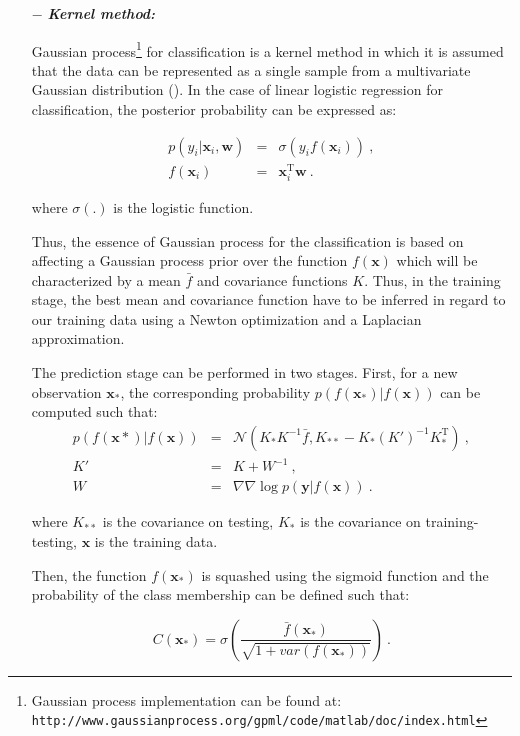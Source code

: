 \begin{enumerate}[leftmargin=*]
\item[$-$] \textbf{\textit{Kernel method:}}

Gaussian process\footnote{Gaussian process implementation can be found at: \texttt{http://www.\allowbreak gaussianprocess.org/gpml/code/matlab/doc/index.html}} for classification is a kernel method in which it is assumed that the data can be represented as a single sample from a multivariate Gaussian distribution (\cite{Rasmussen2005}). In the case of linear logistic regression for classification, the posterior probability can be expressed as:

\begin{eqnarray}
	p(y_i|\mathbf{x}_i,\mathbf{w}) & = & \sigma(y_i f(\mathbf{x}_i)) \ , \label{eq:gp1} \\
	f(\mathbf{x}_i) & = & \mathbf{x}_i^{\text{T}} \mathbf{w} \ . \nonumber
\end{eqnarray}

\noindent where $\sigma(.)$ is the logistic function.

Thus, the essence of Gaussian process for the classification is based on affecting a Gaussian process prior over the function $f(\mathbf{x})$ which will be characterized by a mean $\bar{f}$ and covariance functions $K$. Thus, in the training stage, the best mean and covariance function have to be inferred in regard to our training data using a Newton optimization and a Laplacian approximation.

The prediction stage can be performed in two stages. First, for a new observation $\mathbf{x}_*$, the corresponding probability $p(f(\mathbf{x}_*)|f(\mathbf{x}))$ can be computed such that:
\begin{eqnarray}
	p(f(\mathbf{x}*)|f(\mathbf{x})) & = & \mathcal{N}( K_*K^{-1}\bar{f}, K_{**}-K_*(K')^{-1}K_*^{\text{T}} ) \ , \nonumber \\
	K' & = & K + W^{-1} \ , \label{eq:gp2} \\
	W & = & \nabla \nabla \log p(\mathbf{y}|f(\mathbf{x})) \ . \nonumber
\end{eqnarray}

\noindent where $K_{**}$ is the covariance on testing, $K_{*}$ is the covariance on training-testing, $\mathbf{x}$ is the training data.

Then, the function $f(\mathbf{x}_*)$ is squashed using the sigmoid function and the probability of the class membership can be defined such that:

\begin{equation}
	C(\mathbf{x}_*) = \sigma\left( \frac{\bar{f}(\mathbf{x_*})}{\sqrt{1+var(f(\mathbf{x}_*))}} \right) \ .
	\label{eq:gp3}
\end{equation}


\end{enumerate}

